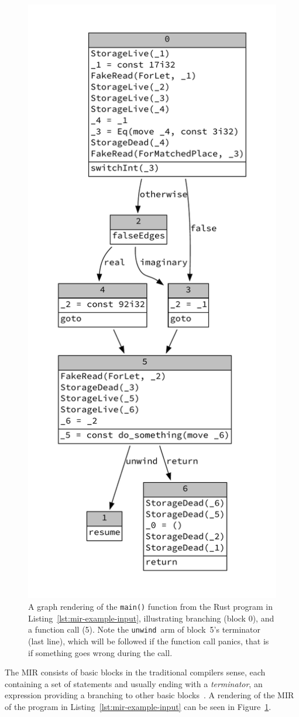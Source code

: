 \documentclass[11pt,a4paper,twoside,openany]{report}
\newcommand{\InRust}[1]{\texttt{#1}}
\begin{document}
\begin{figure}
  \includegraphics[width=0.65\linewidth]{Graphs/mir-example}
  \caption[MIR of a Small Rust Program With
  Function Call]{A graph rendering of the \InRust{main()} function from the Rust
    program in Listing~\ref{lst:mir-example-input}, illustrating branching
    (block 0), and a function call (5). Note the \texttt{unwind}~arm of
    block~5's terminator (last line), which will be followed if the function
    call panics, that is if something goes wrong during the call.}
  \label{fig:mir-example}
\end{figure}

The MIR consists of basic blocks in the traditional compilers sense, each
containing a set of statements and usually ending with a \emph{terminator}, an
expression providing a branching to other basic blocks~\cite{mir_rfc}. A
rendering of the MIR of the program in Listing~\ref{lst:mir-example-input} can
be seen in Figure~\ref{fig:mir-example}.
\end{document}

